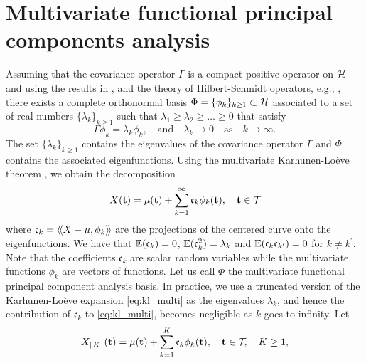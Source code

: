 \section{Multivariate functional principal components analysis} %
\label{sec:functional_principal_components_analysis}

Assuming that the covariance operator $\Gamma$ is a compact positive operator on $\mathcal{H}$ and using the results in \cite{happMultivariateFunctionalPrincipal2018a}, and the theory of Hilbert-Schmidt operators, e.g., \cite{reedMethodsModernMathematical1980}, there exists a complete orthonormal basis 
$\Phi = \{\phi_k\}_{k \geq 1} \subset \mathcal{H}$ associated to a set of real numbers $\{\lambda_k\}_{k \geq 1}$ such that $\lambda_1 \geq \lambda_2 \geq \dots \geq 0$ that satisfy
\begin{equation}\label{eq:eigendecomposition}
    \Gamma \phi_k = \lambda_k \phi_k, \quad\text{and}\quad \lambda_k \longrightarrow 0 \quad\text{as}\quad k \longrightarrow \infty.
\end{equation}
The set $\{\lambda_k\}_{k \geq 1}$ contains the eigenvalues of the covariance operator $\Gamma$ and $\Phi$ contains the associated eigenfunctions. Using the multivariate Karhunen-Loève theorem \citep{happMultivariateFunctionalPrincipal2018a}, we obtain the decomposition
\begin{equation}\label{eq:kl_multi}
    X(\mathbf{t}) = \mu(\mathbf{t}) + \sum_{k = 1}^\infty \mathfrak{c}_k \phi_k(\mathbf{t}), \quad \mathbf{t} \in \mathcal{T}_{}
\end{equation}
where $\mathfrak{c}_{k} = \langle\!\langle X - \mu, \phi_k\rangle\!\rangle$ are the projections of the centered curve onto the eigenfunctions. We have that $\mathbb{E}(\mathfrak{c}_{k}) = 0$, $\mathbb{E}(\mathfrak{c}_{k}^2) = \lambda_k$ and $\mathbb{E}(\mathfrak{c}_{k}\mathfrak{c}_{k^\prime}) = 0$ for $k \neq k^\prime$. Note that the coefficients $\mathfrak{c}_k$ are scalar random variables while the multivariate functions $\phi_k$ are vectors of functions. Let us call $\Phi$ the multivariate functional principal component analysis basis. In practice, we use a truncated version of the Karhunen-Loève expansion \eqref{eq:kl_multi} as the eigenvalues $\lambda_k$, and hence the contribution of $\mathfrak{c}_k$ to \eqref{eq:kl_multi}, becomes negligible as $k$ goes to infinity. Let
\begin{equation}\label{eq:kl_multi_trunc}
    X_{\lceil K \rceil}(\mathbf{t}) = \mu(\mathbf{t}) + \sum_{k = 1}^K \mathfrak{c}_k \phi_k(\mathbf{t}), \quad \mathbf{t} \in \mathcal{T}_{}, \quad K \geq 1,
\end{equation}
